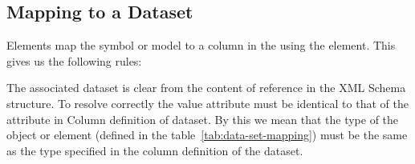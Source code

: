 \subsection{Mapping to a Dataset}

Elements map the symbol or model to a column in the 
using the  element. This gives us the following rules:

\begin{valrules}
   The associated dataset is clear
  from the content of reference in the XML Schema structure. To
  resolve correctly the value  attribute must be identical
  to that of the  attribute in Column definition of
  dataset.
 By this we mean that the type of
the object or element (defined in the table~\ref{tab:data-set-mapping}) must be the same as
the type specified in the column definition of the dataset.
\end{valrules}

%


